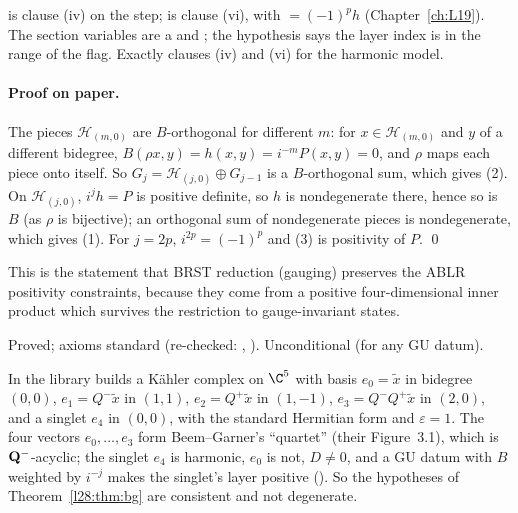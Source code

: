 \begin{dictionary}
 is clause (iv) on the step;  is clause (vi), with
$=(-1)^ph$ (Chapter~\ref{ch:L19}). The section variables are a  and ; the hypothesis
 says the layer index is in the range of the flag. Exactly clauses (iv) and (vi) for the harmonic model.
\end{dictionary}

\paragraph{Proof on paper.} The pieces $\mathcal H_{(m,0)}$ are $B$-orthogonal for different $m$: for $x\in\mathcal H_{(m,0)}$ and $y$ of a different
bidegree, $B(\rho x,y)=h(x,y)=i^{-m}P(x,y)=0$, and $\rho$ maps each piece onto itself. So $G_j=\mathcal H_{(j,0)}\oplus G_{j-1}$ is a $B$-orthogonal sum, which gives (2). On
$\mathcal H_{(j,0)}$, $i^jh=P$ is positive definite, so $h$ is nondegenerate there, hence so is $B$ (as $\rho$ is bijective); an orthogonal sum
of nondegenerate pieces is nondegenerate, which gives (1). For $j=2p$, $i^{2p}=(-1)^p$ and (3) is positivity of $P$. \qed

\begin{physics}
This is the statement that BRST reduction (gauging) preserves the ABLR positivity constraints, because they come from a positive
four-dimensional inner product which survives the restriction to gauge-invariant states.
\end{physics}

\begin{status}
Proved; axioms standard (re-checked: , ). Unconditional (for any GU datum).
\end{status}

\begin{example}\label{l28:ex:quartet}
In  the library builds a Kähler complex on $\C^5$ with basis $e_0=\tilde x$ in bidegree $(0,0)$,
$e_1=Q^-\tilde x$ in $(1,1)$, $e_2=Q^+\tilde x$ in $(1,-1)$, $e_3=Q^-Q^+\tilde x$ in $(2,0)$, and a singlet $e_4$ in $(0,0)$, with the standard
Hermitian form and $\varepsilon=1$. The four vectors $e_0,\dots,e_3$ form Beem--Garner's ``quartet'' (their Figure~3.1), which is
$\mathbf Q^-$-acyclic; the singlet $e_4$ is harmonic, $e_0$ is not, $D\neq0$, and a GU datum with $B$ weighted by $i^{-j}$ makes the
singlet's layer positive (). So the hypotheses of Theorem~\ref{l28:thm:bg} are consistent and not degenerate.
\end{example}

